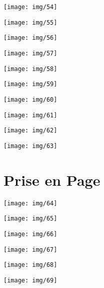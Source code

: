 \documentclass[a4paper, 12pt, twoside,openright]{report}
\begin{document}
\begin{landscape} 		
	\texttt{[image: img/54]}
\end{landscape}
\begin{landscape} 		
	\texttt{[image: img/55]}
\end{landscape}
\begin{landscape} 		
	\texttt{[image: img/56]}
\end{landscape}
\begin{landscape} 		
	\texttt{[image: img/57]}
\end{landscape}
\begin{landscape} 		
	\texttt{[image: img/58]}
\end{landscape}
\begin{landscape} 		
	\texttt{[image: img/59]}
\end{landscape}
\begin{landscape} 		
	\texttt{[image: img/60]}
\end{landscape}
\begin{landscape} 		
	\texttt{[image: img/61]}
\end{landscape}
\begin{landscape} 		
	\texttt{[image: img/62]}
\end{landscape}
\begin{landscape} 		
	\texttt{[image: img/63]}
\end{landscape}

\part{Prise en Page}
\begin{landscape} 		
	\texttt{[image: img/64]}
\end{landscape}
\begin{landscape} 		
	\texttt{[image: img/65]}
\end{landscape}
\begin{landscape} 		
	\texttt{[image: img/66]}
\end{landscape}
\begin{landscape} 		
	\texttt{[image: img/67]}
\end{landscape}
\begin{landscape} 		
	\texttt{[image: img/68]}
\end{landscape}
\begin{landscape} 		
	\texttt{[image: img/69]}
\end{landscape}
\end{document}
